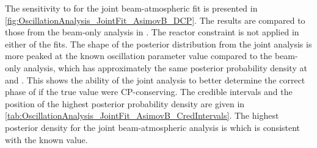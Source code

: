 The sensitivity to  for the joint beam-atmospheric fit is presented in \autoref{fig:OscillationAnalysis_JointFit_AsimovB_DCP}. The results are compared to those from the beam-only analysis in \cite{Dunne2020-uf, t2k_tn_393}. The reactor constraint is not applied in either of the fits. The shape of the posterior distribution from the joint analysis is more peaked at the known oscillation parameter value compared to the beam-only analysis, which has approximately the same posterior probability density at  and . This shows the ability of the joint analysis to better determine the correct phase of  if the true value were CP-conserving. The \quickmath{1\sigma} credible intervals and the position of the highest posterior probability density are given in \autoref{tab:OscillationAnalysis_JointFit_AsimovB_CredIntervals}. The highest posterior density for the joint beam-atmospheric analysis is  which is consistent with the known value.

